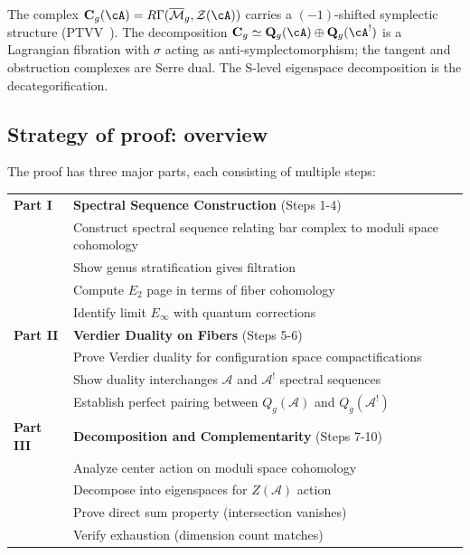 \begin{remark}\label{rem:homotopy-native-c}
The complex $\mathbf{C}_g(\cA)=R\Gamma(\overline{\mathcal{M}}_g,
\mathcal{Z}(\cA))$ carries a $(-1)$-shifted symplectic structure
(PTVV~\cite{PTVV13}).
The decomposition $\mathbf{C}_g\simeq\mathbf{Q}_g(\cA)\oplus
\mathbf{Q}_g(\cA^!)$ is a Lagrangian fibration with $\sigma$ acting
as anti-symplectomorphism; the tangent and obstruction complexes are
Serre dual.  The S-level eigenspace decomposition is the
decategorification.
\end{remark}

\subsection{Strategy of proof: overview}

The proof has three major parts, each consisting of multiple steps:

\begin{center}
\begin{tabular}{|l|p{10cm}|}
\hline
\textbf{Part I} & \textbf{Spectral Sequence Construction} (Steps 1-4)\\
& Construct spectral sequence relating bar complex to moduli space cohomology\\
& Show genus stratification gives filtration\\
& Compute $E_2$ page in terms of fiber cohomology\\
& Identify limit $E_\infty$ with quantum corrections\\
\hline
\textbf{Part II} & \textbf{Verdier Duality on Fibers} (Steps 5-6)\\
& Prove Verdier duality for configuration space compactifications\\
& Show duality interchanges $\mathcal{A}$ and $\mathcal{A}^!$ spectral sequences\\
& Establish perfect pairing between $Q_g(\mathcal{A})$ and $Q_g(\mathcal{A}^!)$\\
\hline
\textbf{Part III} & \textbf{Decomposition and Complementarity} (Steps 7-10)\\
& Analyze center action on moduli space cohomology\\
& Decompose into eigenspaces for $Z(\mathcal{A})$ action\\
& Prove direct sum property (intersection vanishes)\\
& Verify exhaustion (dimension count matches)\\
\hline
\end{tabular}
\end{center}

